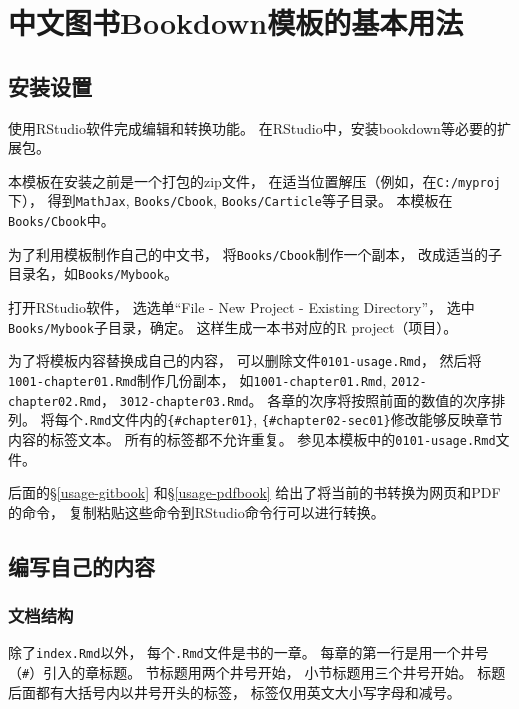 \documentclass[
]{article}
\author{}
\date{\vspace{-2.5em}}
\begin{document}
{
\setcounter{tocdepth}{2}
\tableofcontents
}
\hypertarget{usage}{%
\section{中文图书Bookdown模板的基本用法}\label{usage}}

\hypertarget{usage-ins}{%
\subsection{安装设置}\label{usage-ins}}

使用RStudio软件完成编辑和转换功能。
在RStudio中，安装bookdown等必要的扩展包。

本模板在安装之前是一个打包的zip文件，
在适当位置解压（例如，在\texttt{C:/myproj}下），
得到\texttt{MathJax}, \texttt{Books/Cbook}, \texttt{Books/Carticle}等子目录。
本模板在\texttt{Books/Cbook}中。

为了利用模板制作自己的中文书，
将\texttt{Books/Cbook}制作一个副本，
改成适当的子目录名，如\texttt{Books/Mybook}。

打开RStudio软件，
选选单``File - New Project - Existing Directory''，
选中\texttt{Books/Mybook}子目录，确定。
这样生成一本书对应的R project（项目）。

为了将模板内容替换成自己的内容，
可以删除文件\texttt{0101-usage.Rmd}，
然后将\texttt{1001-chapter01.Rmd}制作几份副本，
如\texttt{1001-chapter01.Rmd}, \texttt{2012-chapter02.Rmd}，
\texttt{3012-chapter03.Rmd}。
各章的次序将按照前面的数值的次序排列。
将每个\texttt{.Rmd}文件内的\texttt{\{\#chapter01\}}, \texttt{\{\#chapter02-sec01\}}修改能够反映章节内容的标签文本。
所有的标签都不允许重复。
参见本模板中的\texttt{0101-usage.Rmd}文件。

后面的§\ref{usage-gitbook} 和§\ref{usage-pdfbook} 给出了将当前的书转换为网页和PDF的命令，
复制粘贴这些命令到RStudio命令行可以进行转换。

\hypertarget{usage-writing}{%
\subsection{编写自己的内容}\label{usage-writing}}

\hypertarget{usage-writing-struct}{%
\subsubsection{文档结构}\label{usage-writing-struct}}

除了\texttt{index.Rmd}以外，
每个\texttt{.Rmd}文件是书的一章。
每章的第一行是用一个井号（\texttt{\#}）引入的章标题。
节标题用两个井号开始，
小节标题用三个井号开始。
标题后面都有大括号内以井号开头的标签，
标签仅用英文大小写字母和减号。
\end{document}
